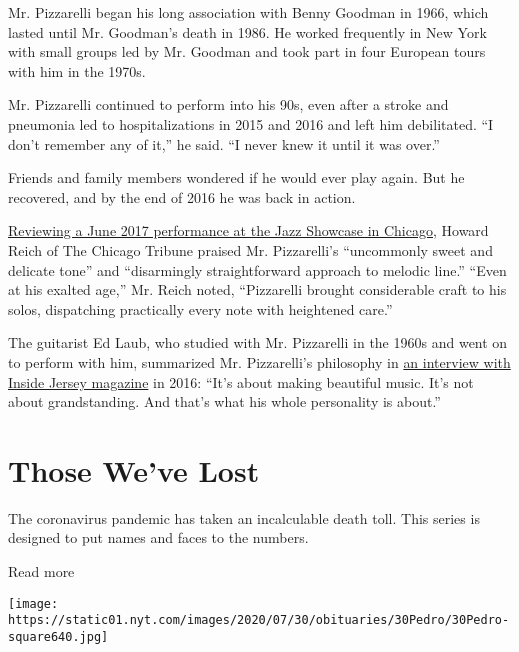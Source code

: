 Mr. Pizzarelli began his long association with Benny Goodman in 1966,
which lasted until Mr. Goodman's death in 1986. He worked frequently in
New York with small groups led by Mr. Goodman and took part in four
European tours with him in the 1970s.

Mr. Pizzarelli continued to perform into his 90s, even after a stroke
and pneumonia led to hospitalizations in 2015 and 2016 and left him
debilitated. ``I don't remember any of it,'' he said. ``I never knew it
until it was over.''

Friends and family members wondered if he would ever play again. But he
recovered, and by the end of 2016 he was back in action.

\href{http://www.chicagotribune.com/entertainment/music/reich/ct-ent-0624-bucky-pizzarelli-20170623-column.html}{Reviewing
a June 2017 performance at the Jazz Showcase in Chicago}, Howard Reich
of The Chicago Tribune praised Mr. Pizzarelli's ``uncommonly sweet and
delicate tone'' and ``disarmingly straightforward approach to melodic
line.'' ``Even at his exalted age,'' Mr. Reich noted, ``Pizzarelli
brought considerable craft to his solos, dispatching practically every
note with heightened care.''

The guitarist Ed Laub, who studied with Mr. Pizzarelli in the 1960s and
went on to perform with him, summarized Mr. Pizzarelli's philosophy in
\href{https://www.nj.com/inside-jersey/index.ssf/2016/12/nj_guitar_master_bucky_pizzarelli_turns_back_time_as_he_plays_on.html}{an
interview with Inside Jersey magazine} in 2016: ``It's about making
beautiful music. It's not about grandstanding. And that's what his whole
personality is about.''

\href{https://www.nytimes.com/interactive/2020/obituaries/people-died-coronavirus-obituaries.html?action=click\&pgtype=Article\&state=default\&region=BELOW_MAIN_CONTENT\&context=covid_obits_promo}{}

\hypertarget{those-weve-lost}{%
\section{Those We've Lost}\label{those-weve-lost}}

The coronavirus pandemic has taken an incalculable death toll. This
series is designed to put names and faces to the numbers.

Read more

\texttt{[image: https://static01.nyt.com/images/2020/07/30/obituaries/30Pedro/30Pedro-square640.jpg]}

